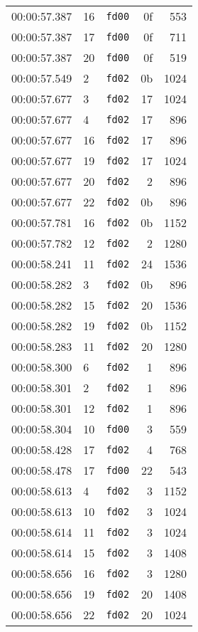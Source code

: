 \documentclass{article}
\begin{document}
\begin{longtable}{lllrr}
00:00:57.387 & 16 & \texttt{fd00} & 0f & 553 \\
00:00:57.387 & 17 & \texttt{fd00} & 0f & 711 \\
00:00:57.387 & 20 & \texttt{fd00} & 0f & 519 \\
00:00:57.549 & 2 & \texttt{fd02} & 0b & 1024 \\
00:00:57.677 & 3 & \texttt{fd02} & 17 & 1024 \\
00:00:57.677 & 4 & \texttt{fd02} & 17 & 896 \\
00:00:57.677 & 16 & \texttt{fd02} & 17 & 896 \\
00:00:57.677 & 19 & \texttt{fd02} & 17 & 1024 \\
00:00:57.677 & 20 & \texttt{fd02} & 2 & 896 \\
00:00:57.677 & 22 & \texttt{fd02} & 0b & 896 \\
00:00:57.781 & 16 & \texttt{fd02} & 0b & 1152 \\
00:00:57.782 & 12 & \texttt{fd02} & 2 & 1280 \\
00:00:58.241 & 11 & \texttt{fd02} & 24 & 1536 \\
00:00:58.282 & 3 & \texttt{fd02} & 0b & 896 \\
00:00:58.282 & 15 & \texttt{fd02} & 20 & 1536 \\
00:00:58.282 & 19 & \texttt{fd02} & 0b & 1152 \\
00:00:58.283 & 11 & \texttt{fd02} & 20 & 1280 \\
00:00:58.300 & 6 & \texttt{fd02} & 1 & 896 \\
00:00:58.301 & 2 & \texttt{fd02} & 1 & 896 \\
00:00:58.301 & 12 & \texttt{fd02} & 1 & 896 \\
00:00:58.304 & 10 & \texttt{fd00} & 3 & 559 \\
00:00:58.428 & 17 & \texttt{fd02} & 4 & 768 \\
00:00:58.478 & 17 & \texttt{fd00} & 22 & 543 \\
00:00:58.613 & 4 & \texttt{fd02} & 3 & 1152 \\
00:00:58.613 & 10 & \texttt{fd02} & 3 & 1024 \\
00:00:58.614 & 11 & \texttt{fd02} & 3 & 1024 \\
00:00:58.614 & 15 & \texttt{fd02} & 3 & 1408 \\
00:00:58.656 & 16 & \texttt{fd02} & 3 & 1280 \\
00:00:58.656 & 19 & \texttt{fd02} & 20 & 1408 \\
00:00:58.656 & 22 & \texttt{fd02} & 20 & 1024 \\

\end{longtable}
\end{document}
